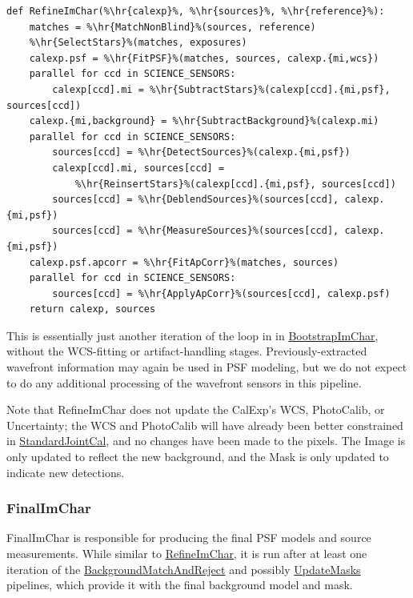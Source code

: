 \newcommand{\hr}[1]{\hyperref[sec:drpBootstrapImChar_#1]{#1}}

\begin{lstlisting}
def RefineImChar(%\hr{calexp}%, %\hr{sources}%, %\hr{reference}%):
    matches = %\hr{MatchNonBlind}%(sources, reference)
    %\hr{SelectStars}%(matches, exposures)
    calexp.psf = %\hr{FitPSF}%(matches, sources, calexp.{mi,wcs})
    parallel for ccd in SCIENCE_SENSORS:
        calexp[ccd].mi = %\hr{SubtractStars}%(calexp[ccd].{mi,psf}, sources[ccd])
    calexp.{mi,background} = %\hr{SubtractBackground}%(calexp.mi)
    parallel for ccd in SCIENCE_SENSORS:
        sources[ccd] = %\hr{DetectSources}%(calexp.{mi,psf})
        calexp[ccd].mi, sources[ccd] =
            %\hr{ReinsertStars}%(calexp[ccd].{mi,psf}, sources[ccd])
        sources[ccd] = %\hr{DeblendSources}%(sources[ccd], calexp.{mi,psf})
        sources[ccd] = %\hr{MeasureSources}%(sources[ccd], calexp.{mi,psf})
    calexp.psf.apcorr = %\hr{FitApCorr}%(matches, sources)
    parallel for ccd in SCIENCE_SENSORS:
        sources[ccd] = %\hr{ApplyApCorr}%(sources[ccd], calexp.psf)
    return calexp, sources
\end{lstlisting}

This is essentially just another iteration of the loop in in \hyperref[sec:drpBootstrapImChar]{BootstrapImChar}, without the WCS-fitting or artifact-handling stages.  Previously-extracted wavefront information may again be used in PSF modeling, but we do not expect to do any additional processing of the wavefront sensors in this pipeline.

Note that RefineImChar does not update the CalExp's WCS, PhotoCalib, or Uncertainty; the WCS and PhotoCalib will have already been better constrained in \hyperref[sec:drpStandardJointCal]{StandardJointCal}, and no changes have been made to the pixels.  The Image is only updated to reflect the new background, and the Mask is only updated to indicate new detections.


\let\hr\undefined

\subsubsection{FinalImChar}
\label{sec:drpFinalImChar}

FinalImChar is responsible for producing the final PSF models and source measurements.  While similar to \hyperref[sec:drpRefineImChar]{RefineImChar}, it is run after at least one iteration of the \hyperref[sec:drpBackgroundMatchAndReject]{BackgroundMatchAndReject} and possibly \hyperref[sec:drpUpdateMasks]{UpdateMasks} pipelines, which provide it with the final background model and mask.

